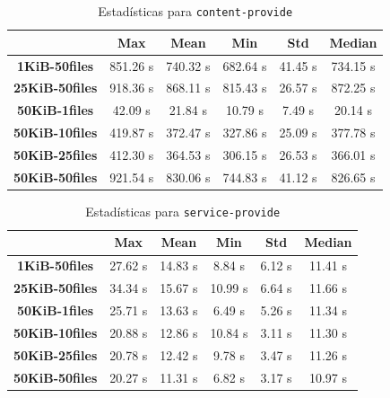 \setlength\tabcolsep{10pt}
\begin{table}[!htbp]
    \centering
    \begin{tabular}{|c|c|c|c|c|c|}
    \hline
    & \textbf{Max} & \textbf{Mean} & \textbf{Min} & \textbf{Std} & \textbf{Median} \\
    \hline
    \textbf{1KiB-50files} & 851.26 s & 740.32 s & 682.64 s & 41.45 s & 734.15 s \\
    \hline
    \textbf{25KiB-50files} & 918.36 s & 868.11 s & 815.43 s & 26.57 s & 872.25 s \\
    \hline
    \textbf{50KiB-1files} & 42.09 s & 21.84 s & 10.79 s & 7.49 s & 20.14 s \\
    \hline
    \textbf{50KiB-10files} & 419.87 s & 372.47 s & 327.86 s & 25.09 s & 377.78 s \\
    \hline
    \textbf{50KiB-25files} & 412.30 s & 364.53 s & 306.15 s & 26.53 s & 366.01 s \\
    \hline
    \textbf{50KiB-50files} & 921.54 s & 830.06 s & 744.83 s & 41.12 s & 826.65 s \\
    \hline
    \end{tabular}
    \caption{Estadísticas para \texttt{content-provide}}
\end{table}

\setlength\tabcolsep{10pt}
\begin{table}[!htbp]
    \centering
    \begin{tabular}{|c|c|c|c|c|c|}
    \hline
    & \textbf{Max} & \textbf{Mean} & \textbf{Min} & \textbf{Std} & \textbf{Median} \\
    \hline
    \textbf{1KiB-50files} & 27.62 s & 14.83 s & 8.84 s & 6.12 s & 11.41 s \\
    \hline
    \textbf{25KiB-50files} & 34.34 s & 15.67 s & 10.99 s & 6.64 s & 11.66 s \\
    \hline
    \textbf{50KiB-1files} & 25.71 s & 13.63 s & 6.49 s & 5.26 s & 11.34 s \\
    \hline
    \textbf{50KiB-10files} & 20.88 s & 12.86 s & 10.84 s & 3.11 s & 11.30 s \\
    \hline
    \textbf{50KiB-25files} & 20.78 s & 12.42 s & 9.78 s & 3.47 s & 11.26 s \\
    \hline
    \textbf{50KiB-50files} & 20.27 s & 11.31 s & 6.82 s & 3.17 s & 10.97 s \\
    \hline
    \end{tabular}
    \caption{Estadísticas para \texttt{service-provide}}
\end{table}

